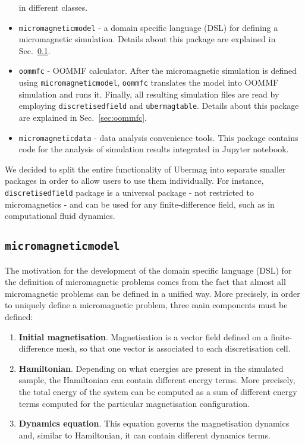 \documentclass{deliverablereport}
\begin{document}
\begin{itemize}
in different classes.
\item \texttt{micromagneticmodel} - a domain specific language (DSL)
for defining a micromagnetic simulation. Details about this package
are explained in Sec.~\ref{sec:micromagneticmodel}.
\item \texttt{oommfc} - OOMMF calculator. After the micromagnetic
simulation is defined using \texttt{micromagneticmodel},
\texttt{oommfc} translates the model into OOMMF simulation and runs
it. Finally, all resulting simulation files are read by employing
\texttt{discretisedfield} and \texttt{ubermagtable}. Details about
this package are explained in Sec.~\ref{sec:oommfc}.
\item \texttt{micromagneticdata} - data analysis convenience
tools. This package contains code for the analysis of simulation
results integrated in Jupyter notebook.
\end{itemize}

We decided to split the entire functionality of Ubermag into separate
smaller packages in order to allow users to use them individually. For
instance, \texttt{discretisedfield} package is a universal package -
not restricted to micromagnetics - and can be used for any
finite-difference field, such as in computational fluid dynamics.

\subsection{\texttt{micromagneticmodel}}\label{sec:micromagneticmodel}

The motivation for the development of the domain specific language
(DSL) for the definition of micromagnetic problems comes from the fact
that almost all micromagnetic problems can be defined in a unified
way. More precisely, in order to uniquely define a micromagnetic
problem, three main components must be defined:


\begin{enumerate}
\item \textbf{Initial magnetisation}. Magnetisation is a vector
field defined on a finite-difference mesh, so that one vector is
associated to each discretisation cell.
\item \textbf{Hamiltonian}. Depending on what energies are present in
the simulated sample, the Hamiltonian can contain different energy
terms. More precisely, the total energy of the system can be computed
as a sum of different energy terms computed for the particular
magnetisation configuration.
\item \textbf{Dynamics equation}. This equation governs the
magnetisation dynamics and, similar to Hamiltonian, it can contain
different dynamics terms.
\end{enumerate}
\end{document}
